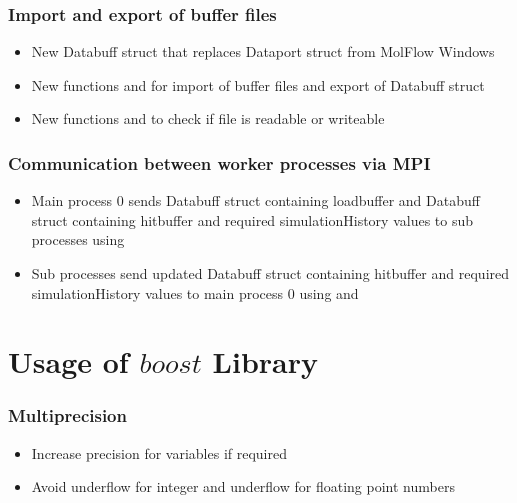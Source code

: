 \subsubsection{Import and export of buffer files}
\begin{itemize}[noitemsep,topsep=0pt]
\item New Databuff struct that replaces Dataport struct from MolFlow Windows 
\item New functions  and  for import of buffer files and export of Databuff struct
\item New functions  and  to check if file is readable or writeable
\end{itemize}

\subsubsection{Communication between worker processes via MPI}
\begin{itemize}[noitemsep,topsep=0pt]
\item Main process 0 sends Databuff struct containing loadbuffer and Databuff struct containing hitbuffer and required simulationHistory values to sub processes using 
\item Sub processes send updated Databuff struct containing hitbuffer and required simulationHistory values to main process 0 using  and 
\end{itemize}

\section{Usage of $boost$ Library}
\subsubsection{Multiprecision}
\begin{itemize}[noitemsep,topsep=0pt]
\item Increase precision for variables if required
\item Avoid underflow for integer and underflow for floating point numbers
\end{itemize}
\newpage
